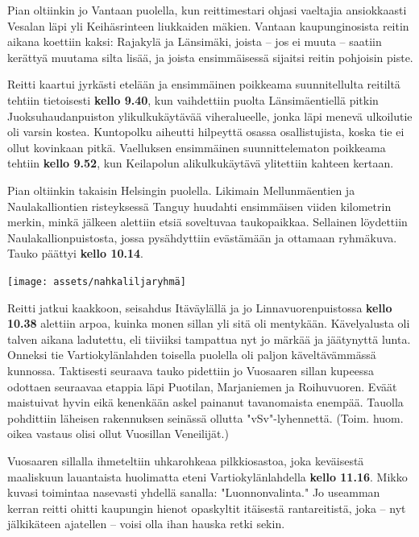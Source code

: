 \documentclass[10pt,finnish,a5paper,headings=small,twoside=semi]{scrartcl}
\begin{document}
\begin{multicols}{2}
	Pian oltiinkin jo Vantaan puolella, kun reittimestari ohjasi vaeltajia
	ansiokkaasti Vesalan läpi yli Keihäsrinteen liukkaiden mäkien. Vantaan
	kaupunginosista reitin aikana koettiin kaksi: Rajakylä ja Länsimäki,
	joista – jos ei muuta – saatiin kerättyä muutama silta lisää, ja joista
	ensimmäisessä sijaitsi reitin pohjoisin piste.

	Reitti kaartui jyrkästi etelään ja ensimmäinen poikkeama suunnitellulta
	reitiltä tehtiin tietoisesti \textbf{kello 9.40}, kun vaihdettiin
	puolta Länsimäentiellä pitkin Juoksuhaudanpuiston ylikulkukäytävää
	viheralueelle, jonka läpi menevä ulkoilutie oli varsin kostea.
	Kuntopolku aiheutti hilpeyttä osassa osallistujista, koska tie ei ollut
	kovinkaan pitkä. Vaelluksen ensimmäinen suunnittelematon poikkeama
	tehtiin \textbf{kello 9.52}, kun Keilapolun alikulkukäytävä ylitettiin
	kahteen kertaan.

	Pian oltiinkin takaisin Helsingin puolella. Likimain Mellunmäentien ja
	Naulakalliontien risteyksessä Tanguy huudahti ensimmäisen viiden
	kilometrin merkin, minkä jälkeen alettiin etsiä soveltuvaa
	taukopaikkaa. Sellainen löydettiin Naulakallionpuistosta, jossa
	pysähdyttiin evästämään ja ottamaan ryhmäkuva. Tauko päättyi
	\textbf{kello 10.14}.

	\vspace*{0.32cm}
	\noindent\texttt{[image: assets/nahkaliljaryhmä]}

	Reitti jatkui kaakkoon, seisahdus Itäväylällä ja jo
	Linnavuorenpuistossa \textbf{kello 10.38} alettiin arpoa, kuinka monen
	sillan yli sitä oli mentykään. Kävelyalusta oli talven aikana
	ladutettu, eli tiiviiksi tampattua nyt jo märkää ja jäätynyttä lunta.
	Onneksi tie Vartiokylänlahden toisella puolella oli paljon
	käveltävämmässä kunnossa. Taktisesti seuraava tauko pidettiin jo
	Vuosaaren sillan kupeessa odottaen seuraavaa etappia läpi Puotilan,
	Marjaniemen ja Roihuvuoren. Eväät maistuivat hyvin eikä kenenkään askel
	painanut tavanomaista enempää. Tauolla pohdittiin läheisen rakennuksen
	seinässä ollutta "vSv"-lyhennettä. (Toim. huom. oikea vastaus olisi
	ollut Vuosillan Veneilijät.)

	Vuosaaren sillalla ihmeteltiin uhkarohkeaa pilkkiosastoa, joka
	keväisestä maaliskuun lauantaista huolimatta eteni Vartiokylänlahdella
	\textbf{kello 11.16}. Mikko kuvasi toimintaa nasevasti yhdellä sanalla:
	"Luonnonvalinta." Jo useamman kerran reitti ohitti kaupungin hienot
	opaskyltit itäisestä rantareitistä, joka – nyt jälkikäteen ajatellen –
	voisi olla ihan hauska retki sekin.


\end{multicols}
\end{document}
